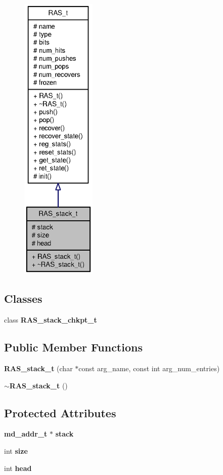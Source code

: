 \begin{figure}[H]
\begin{center}
\leavevmode
\includegraphics[height=400pt]{classRAS__stack__t__coll__graph}
\end{center}
\end{figure}
\subsection*{Classes}
\begin{CompactItemize}
\item 
class {\bf RAS\_\-stack\_\-chkpt\_\-t}
\end{CompactItemize}
\subsection*{Public Member Functions}
\begin{CompactItemize}
\item 
{\bf RAS\_\-stack\_\-t} (char $\ast$const arg\_\-name, const int arg\_\-num\_\-entries)
\item 
{\bf $\sim$RAS\_\-stack\_\-t} ()
\end{CompactItemize}
\subsection*{Protected Attributes}
\begin{CompactItemize}
\item 
{\bf md\_\-addr\_\-t} $\ast$ {\bf stack}
\item 
int {\bf size}
\item 
int {\bf head}
\end{CompactItemize}


